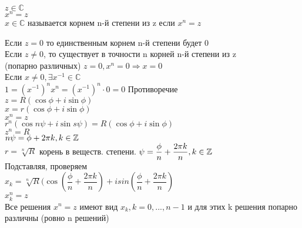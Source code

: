 \begin{definition}
	$ z \in \mathbb{C} $ \\
	$ x^n = z $ \\
	$ x \in \mathbb{C} $ называется корнем n-й степени из z если $x^n = z$ \\
\end{definition}
\noindent
Если $ z = 0 $ то единственным корнем n-й степени будет 0 \\
Если $ z \neq 0 $, то существует в точности n корней n-й степени из z\\
(попарно различных)
$ z = 0, x^n=0 \Rightarrow x = 0$ \\
Если $ x \neq 0, \exists x^{-1} \in \mathbb{C} $\\
$ 1 = (x^{-1})^n x^n = (x^{-1})^n \cdot 0 = 0 $ Противоречие \\
$ z = R(\cos \phi + i \sin \phi) $ \\
$ x = r(\cos \phi + i \sin \phi) $ \\
$ x^n = z $ \\
$ r^n(\cos n \psi + i \sin s\psi) = R(\cos \phi + i \sin \phi) $ \\
$ z^n = R $  \\
$ n \psi = \phi + 2 \pi k, k \in \mathbb{Z} $\\
$ r = \sqrt[n]{R} $ корень в веществ. степени.
$ \psi = \dfrac{\phi}{n} + \dfrac{2 \pi k}{n}, k \in \mathbb{Z} $ \\
Подставляя, проверяем \\
$ x_k = \sqrt[n]{R} (\cos( \dfrac{\phi}{n} + \dfrac{2 \pi k}{n}) + i sin( \dfrac{\phi}{n} + \dfrac{2 \pi k}{n} )$ \\
$ x_k^n = z $\\
Все решения $ x^n=z $ имеют вид $x_k, k = 0, ..., n-1$ и для этих k решения попарно различны (ровно n решений) \\
